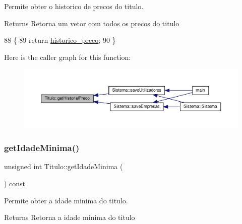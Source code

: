 Permite obter o historico de precos do titulo. 

\begin{DoxyReturn}{Returns}
Retorna um vetor com todos os precos do titulo 
\end{DoxyReturn}

\begin{DoxyCode}
88                                                  \{
89      \textcolor{keywordflow}{return} \hyperlink{classTitulo_aad5a44ca7e83939e8b47f1e11b80eca2}{historico\_preco};
90  \}
\end{DoxyCode}
Here is the caller graph for this function\+:
\nopagebreak
\begin{figure}[H]
\begin{center}
\leavevmode
\includegraphics[width=350pt]{classTitulo_ab392d79a55b0ce556e03ad5a2fecad05_icgraph}
\end{center}
\end{figure}
\mbox{\label{classTitulo_a8048db7604abd58892122c810a6794be}} 
\subsubsection{\texorpdfstring{get\+Idade\+Minima()}{getIdadeMinima()}}
{\footnotesize\ttfamily unsigned int Titulo\+::get\+Idade\+Minima (\begin{DoxyParamCaption}{ }\end{DoxyParamCaption}) const}



Permite obter a idade minima do titulo. 

\begin{DoxyReturn}{Returns}
Retorna a idade minima do titulo 
\end{DoxyReturn}

